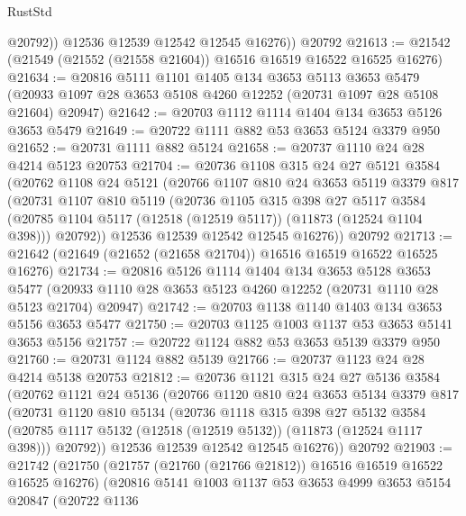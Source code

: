 \begin{lexlean}{RustStd}
\begin{coremodule}
            @20792))
        @12536
        @12539
        @12542
        @12545
        @16276))
    @20792
@21613 := @21542 (@21549 (@21552 (@21558 @21604)) @16516 @16519 @16522 @16525 @16276)
@21634 := @20816
    @5111
    @1101
    @1405
    @134
    @3653
    @5113
    @3653
    @5479
    (@20933 @1097 @28 @3653 @5108 @4260 @12252 (@20731 @1097 @28 @5108 @21604) @20947)
@21642 := @20703 @1112 @1114 @1404 @134 @3653 @5126 @3653 @5479
@21649 := @20722 @1111 @882 @53 @3653 @5124 @3379 @950
@21652 := @20731 @1111 @882 @5124
@21658 := @20737 @1110 @24 @28 @4214 @5123 @20753
@21704 := @20736
    @1108
    @315
    @24
    @27
    @5121
    @3584
    (@20762
      @1108
      @24
      @5121
      (@20766
        @1107
        @810
        @24
        @3653
        @5119
        @3379
        @817
        (@20731
          @1107
          @810
          @5119
          (@20736
            @1105
            @315
            @398
            @27
            @5117
            @3584
            (@20785 @1104 @5117 (@12518 (@12519 @5117)) (@11873 (@12524 @1104 @398)))
            @20792))
        @12536
        @12539
        @12542
        @12545
        @16276))
    @20792
@21713 := @21642 (@21649 (@21652 (@21658 @21704)) @16516 @16519 @16522 @16525 @16276)
@21734 := @20816
    @5126
    @1114
    @1404
    @134
    @3653
    @5128
    @3653
    @5477
    (@20933 @1110 @28 @3653 @5123 @4260 @12252 (@20731 @1110 @28 @5123 @21704) @20947)
@21742 := @20703 @1138 @1140 @1403 @134 @3653 @5156 @3653 @5477
@21750 := @20703 @1125 @1003 @1137 @53 @3653 @5141 @3653 @5156
@21757 := @20722 @1124 @882 @53 @3653 @5139 @3379 @950
@21760 := @20731 @1124 @882 @5139
@21766 := @20737 @1123 @24 @28 @4214 @5138 @20753
@21812 := @20736
    @1121
    @315
    @24
    @27
    @5136
    @3584
    (@20762
      @1121
      @24
      @5136
      (@20766
        @1120
        @810
        @24
        @3653
        @5134
        @3379
        @817
        (@20731
          @1120
          @810
          @5134
          (@20736
            @1118
            @315
            @398
            @27
            @5132
            @3584
            (@20785 @1117 @5132 (@12518 (@12519 @5132)) (@11873 (@12524 @1117 @398)))
            @20792))
        @12536
        @12539
        @12542
        @12545
        @16276))
    @20792
@21903 := @21742
    (@21750
      (@21757 (@21760 (@21766 @21812)) @16516 @16519 @16522 @16525 @16276)
      (@20816
        @5141
        @1003
        @1137
        @53
        @3653
        @4999
        @3653
        @5154
        @20847
        (@20722
          @1136

\end{coremodule}
\end{lexlean}
